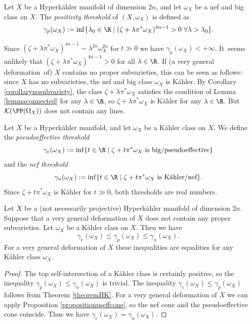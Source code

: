 \begin{definition}
Let $X$ be a Hyperkähler manifold of dimension $2n$, and
let $\omega_X$ be a nef and big class on $X$.
The \emph{positivity threshold} of $(X, \omega_X)$ is defined as
\[
\gamma_p(\omega_X):=\inf \{ \lambda_0 \in \R \mid (\zeta+ \lambda \pi^*\omega_X)^{4n-1}>0\ \forall \lambda > \lambda_0 \}.
\]
\end{definition}

\begin{remark}\label{solution}
Since $(\zeta+ \lambda\pi^*\omega_X)^{4n-1}\sim \lambda ^{2n}\omega_X^{2n}$ for $t \gg 0$
we have \hbox{$\gamma_p(\omega_X)<+\infty$}.
It~seems unlikely that $(\zeta+ \lambda \pi^*\omega_X)^{4n-1}>0$ for all $\lambda \in \R$. If
(a very general deformation~of) $X$ contains no proper subvarieties, this can be seen as follows:
since $X$ has no subvarieties, the nef and big class $\omega_X$ is Kähler.
By Corollary \ref{corollarynosubvariety}, the class $\zeta+ \lambda \pi^*\omega_X$ satisfies the condition
of Lemma \ref{lemmaconnected} for any $\lambda \in \R$, so $\zeta+ \lambda \pi^*\omega_X$ is Kähler
for any $\lambda \in \R$. But $\mathcal K(\PP(\Omega_X))$ does not contain any lines.
\end{remark}

Let $X$ be a Hyperkähler manifold, and let $\omega_X$ be a Kähler class on $X$.
We define the \emph{pseudoeffective threshold}
\[
\gamma_e(\omega_X):=\inf \{ t\in \R \mid \zeta+t\pi^*\omega_X \ \text{is big/pseudoeffective}\}
\]
and the \emph{nef threshold}
\[
\gamma_n(\omega_X):=\inf \{ t\in \R \mid \zeta+t\pi^*\omega_X \ \text{is Kähler/nef}\}.
\]
Since $\zeta+t\pi^*\omega_X$ is Kähler for $t \gg 0$, both thresholds are real numbers.

\begin{proposition}\label{threshold}
Let $X$ be a (not necessarily projective) Hyperkähler manifold of dimension $2n$.
Suppose that a very general deformation of $X$ does not contain any proper subvarieties.
Let $\omega_X$ be a Kähler class on $X$.
Then we have
\[
\gamma_e(\omega_X) \leq \gamma_p(\omega_X) \leq \gamma_n(\omega_X).
\]
For a very general deformation of $X$ these inequalities are equalities for any Kähler class $\omega_X$.
\end{proposition}

\begin{proof}
The top self-intersection of a Kähler class is certainly positive, so the inequality
$\gamma_p(\omega_X) \leq \gamma_n(\omega_X)$ is trivial.
The inequality $\gamma_e (\omega_X) \leq \gamma_p(\omega_X)$
follows from Theorem \ref{theoremHK}.
For a very general deformation of $X$ we can apply Proposition \ref{propositionpseffcone},
so the nef cone and the pseudoeffective cone coincide. Thus we have $\gamma_e(\omega_X) = \gamma_n(\omega_X)$.
\end{proof}

